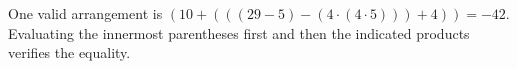 One valid arrangement is $(10+(((29-5)-(4\cdot (4\cdot 5)))+4))=-42$. Evaluating the innermost parentheses first and then the indicated products verifies the equality.
